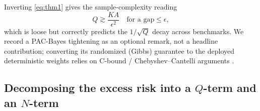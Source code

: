 \documentclass{article} %
\newtheorem{remark}{Remark}
\providecommand{\E}{\mathbb{E}}
\providecommand{\Risk}{R}
\providecommand{\eRisk}{\widehat{R}}
\providecommand{\KL}{\mathrm{KL}}
\providecommand{\Qcal}{\mathcal{Q}}
\providecommand{\Pcal}{\mathcal{P}}
\begin{document}
Inverting \eqref{eq:thm1} gives the sample-complexity reading
\begin{equation}
\label{eq:qneed}
Q \gtrsim \frac{KA}{\epsilon^2}\quad\text{for a gap}\le\epsilon,
\end{equation}
which is loose but correctly predicts the $1/\sqrt Q$ decay across benchmarks.
We record a PAC-Bayes tightening as an optional remark, not a headline
contribution; converting its randomized (Gibbs) guarantee to the deployed
deterministic weights relies on C-bound / Chebyshev--Cantelli arguments
\citep{viallard2021selfboundingmv,wu2021chebyshevcantellipi}.



\subsection{Decomposing the excess risk into a $Q$-term and an $N$-term}
\label{sec:method-decomp}
\end{document}
